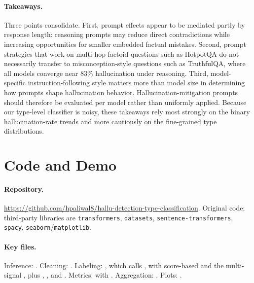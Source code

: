 \documentclass[11pt,a4paper]{article}
\begin{document}
\paragraph{Takeaways.} Three points consolidate. First, prompt effects appear to be mediated partly by response length: reasoning prompts may reduce direct contradictions while increasing opportunities for smaller embedded factual mistakes. Second, prompt strategies that work on multi-hop factoid questions such as HotpotQA do not necessarily transfer to misconception-style questions such as TruthfulQA, where all models converge near 83\% hallucination under reasoning. Third, model-specific instruction-following style matters more than model size in determining how prompts shape hallucination behavior. Hallucination-mitigation prompts should therefore be evaluated per model rather than uniformly applied. Because our type-level classifier is noisy, these takeaways rely most strongly on the binary hallucination-rate trends and more cautiously on the fine-grained type distributions.

\section{Code and Demo}

\paragraph{Repository.} \url{https://github.com/hpaliwal8/hallu-detection-type-classification}. Original code; third-party libraries are \texttt{transformers}, \texttt{datasets}, \texttt{sentence-transformers}, \texttt{spacy}, \texttt{seaborn}/\texttt{matplotlib}.

\paragraph{Key files.} Inference: . Cleaning: . Labeling: , which calls ,  with score-based  and the multi-signal , plus , , and . Metrics:  with . Aggregation: . Plots: .
\end{document}
